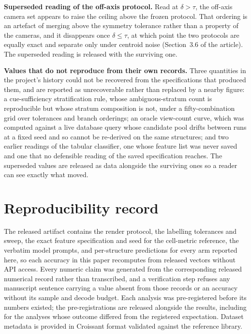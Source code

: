 \textbf{Superseded reading of the off-axis protocol.} Read at $\delta > \tau$, the off-axis camera set
appears to raise the ceiling above the frozen protocol. That ordering is an artefact of merging above the
symmetry tolerance rather than a property of the cameras, and it disappears once $\delta \le \tau$, at which
point the two protocols are equally exact and separate only under centroid noise
(Section~3.6 of the article). The superseded reading is released with the surviving one.

\textbf{Values that do not reproduce from their own records.} Three quantities in the project's history
could not be recovered from the specifications that produced them, and are reported as unrecoverable
rather than replaced by a nearby figure: a cue-sufficiency stratification rule, whose ambiguous-stratum
count is reproducible but whose stratum composition is not, under a fifty-combination grid over
tolerances and branch orderings; an oracle view-count curve, which was computed against a live database
query whose candidate pool drifts between runs at a fixed seed and so cannot be re-derived on the same
structures; and two earlier readings of the tabular classifier, one whose feature list was never saved
and one that no defensible reading of the saved specification reaches. The superseded values are
released as data alongside the surviving ones so a reader can see exactly what moved.

\section{Reproducibility record}
\label{app:repro}
The released artifact contains the render protocol, the labelling tolerances and sweep, the exact feature specification
and seed for the cell-metric reference, the verbatim model prompts, and per-structure predictions for every
arm reported here, so each accuracy in this paper recomputes from released vectors without API access.
Every numeric claim was generated from the corresponding released numerical record rather than
transcribed, and a verification step refuses any manuscript sentence carrying a value absent from those
records or an accuracy without its sample and decode budget. Each analysis was pre-registered before its
numbers existed; the pre-registrations are released alongside the results, including for the analyses whose
outcome differed from the registered expectation. Dataset metadata is provided in Croissant format
validated against the reference library.

